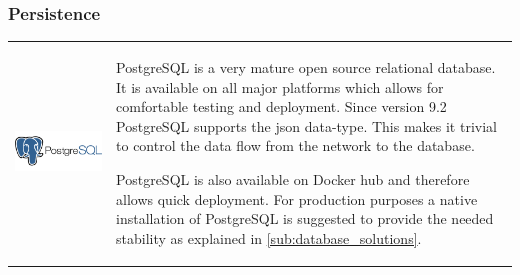 \subsubsection{Persistence}

\begin{table}[h!]
  \centering
  \begin{tabular}{ c m{9cm} }
    \begin{minipage}{.3\textwidth}
      \includegraphics[width=\linewidth]{images/dependencies/PostgreSQL}
    \end{minipage}&
	PostgreSQL is a very mature open source relational database. It is available on
	all major platforms which allows for comfortable testing and deployment.
	Since version 9.2 PostgreSQL supports the json data-type. This makes it trivial
	to control the data flow from the network to the database.
	
	PostgreSQL is also available on Docker hub and therefore allows quick
	deployment. For production purposes a native installation of PostgreSQL is
	suggested to provide the needed stability as explained in
	\autoref{sub:database_solutions}.
  \end{tabular}
\end{table}

